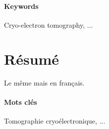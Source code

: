 %
%
%
%
%
%
%

\paragraph{Keywords}
Cryo-electron tomography, ...

\newpage
\section*{Résumé}

Le même mais en français.

\paragraph{Mots clés}
Tomographie cryoélectronique, ...
